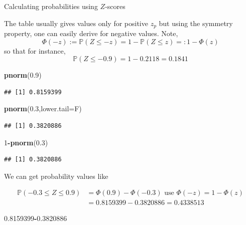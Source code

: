 \documentclass[ignorenonframetext,]{beamer}
\newenvironment{Shaded}{\begin{snugshade}}{\end{snugshade}}
\newcommand{\KeywordTok}[1]{\textcolor[rgb]{0.13,0.29,0.53}{\textbf{#1}}}
\newcommand{\DataTypeTok}[1]{\textcolor[rgb]{0.13,0.29,0.53}{#1}}
\newcommand{\DecValTok}[1]{\textcolor[rgb]{0.00,0.00,0.81}{#1}}
\newcommand{\FloatTok}[1]{\textcolor[rgb]{0.00,0.00,0.81}{#1}}
\newcommand{\OperatorTok}[1]{\textcolor[rgb]{0.81,0.36,0.00}{\textbf{#1}}}
\newcommand{\NormalTok}[1]{#1}
\begin{document}
\begin{frame}[fragile]{Calculating probabilities using \(Z\)-scores}

The table usually gives values only for positive \(z_p\) but using the
symmetry property, one can easily derive for negative values. Note,
\[\Phi(-z):=\mathbb{P}(Z\le -z)=1-\mathbb{P}(Z\le z)=:1-\Phi(z)\] so
that for instance, \[\mathbb{P}(Z\le -0.9)=1-0.2118=0.1841\]

\begin{Shaded}
\begin{Highlighting}[]
\KeywordTok{pnorm}\NormalTok{(}\FloatTok{0.9}\NormalTok{)}
\end{Highlighting}
\end{Shaded}

\begin{verbatim}
## [1] 0.8159399
\end{verbatim}

\begin{Shaded}
\begin{Highlighting}[]
\KeywordTok{pnorm}\NormalTok{(}\FloatTok{0.3}\NormalTok{,}\DataTypeTok{lower.tail=}\NormalTok{F)}
\end{Highlighting}
\end{Shaded}

\begin{verbatim}
## [1] 0.3820886
\end{verbatim}

\begin{Shaded}
\begin{Highlighting}[]
\DecValTok{1}\OperatorTok{-}\KeywordTok{pnorm}\NormalTok{(}\FloatTok{0.3}\NormalTok{)}
\end{Highlighting}
\end{Shaded}

\begin{verbatim}
## [1] 0.3820886
\end{verbatim}

We can get probability values like

\begin{align}\mathbb{P}(-0.3\le Z\le 0.9)&=\Phi(0.9)-\Phi(-0.3)\,\,\text{use}\,\,\Phi(-z)=1-\Phi(z)\\
&=0.8159399-0.3820886= 0.4338513
\end{align}

\begin{Shaded}
\begin{Highlighting}[]
\FloatTok{0.8159399}\OperatorTok{-}\FloatTok{0.3820886}
\end{Highlighting}
\end{Shaded}


\end{frame}
\end{document}
